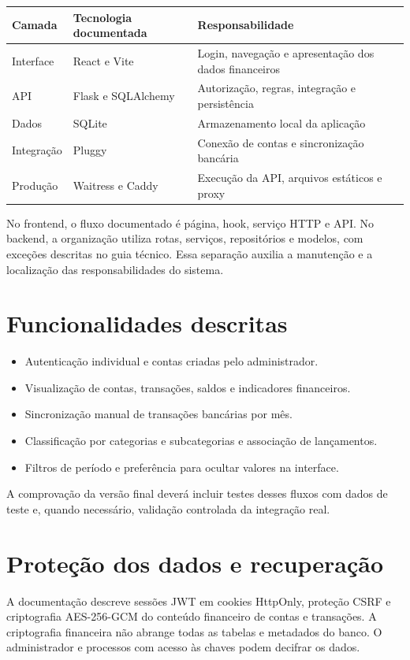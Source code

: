 \documentclass[11pt,a4paper,oneside]{report}
\begin{document}
\begin{tabularx}{\textwidth}{@{}p{3cm}YY@{}}
\toprule
Camada & Tecnologia documentada & Responsabilidade \\
\midrule
Interface & React e Vite & Login, navegação e apresentação dos dados financeiros \\
API & Flask e SQLAlchemy & Autorização, regras, integração e persistência \\
Dados & SQLite & Armazenamento local da aplicação \\
Integração & Pluggy & Conexão de contas e sincronização bancária \\
Produção & Waitress e Caddy & Execução da API, arquivos estáticos e proxy \\
\bottomrule
\end{tabularx}

No frontend, o fluxo documentado é página, hook, serviço HTTP e API. No backend,
a organização utiliza rotas, serviços, repositórios e modelos, com exceções
descritas no guia técnico. Essa separação auxilia a manutenção e a localização
das responsabilidades do sistema.

\section{Funcionalidades descritas}
\begin{itemize}
\item Autenticação individual e contas criadas pelo administrador.
\item Visualização de contas, transações, saldos e indicadores financeiros.
\item Sincronização manual de transações bancárias por mês.
\item Classificação por categorias e subcategorias e associação de lançamentos.
\item Filtros de período e preferência para ocultar valores na interface.
\end{itemize}
A comprovação da versão final deverá incluir testes desses fluxos com dados de
teste e, quando necessário, validação controlada da integração real.

\section{Proteção dos dados e recuperação}
A documentação descreve sessões JWT em cookies HttpOnly, proteção CSRF e
criptografia AES-256-GCM do conteúdo financeiro de contas e transações.
A criptografia financeira não abrange todas as tabelas e metadados do banco.
O administrador e processos com acesso às chaves podem decifrar os dados.
\end{document}
